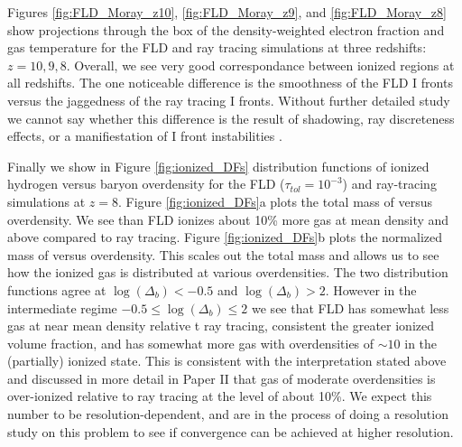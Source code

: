 {Figures \ref{fig:FLD_Moray_z10}, \ref{fig:FLD_Moray_z9}, and \ref{fig:FLD_Moray_z8} show projections through the box of the density-weighted electron fraction and gas temperature for the FLD and ray tracing simulations at three redshifts: $z=10, 9, 8$. Overall, we see very good correspondance between ionized regions at all redshifts. The one noticeable difference is the smoothness of the FLD I fronts versus the jaggedness of the ray tracing I fronts. Without further detailed study we cannot say whether this difference is the result of shadowing, ray discreteness effects, or a manifiestation of I front instabilities \citep{WhalenNorman2008a,WhalenNorman2008b,WhalenNorman2011}. 

Finally we show in Figure \ref{fig:ionized_DFs} distribution functions of ionized hydrogen versus baryon overdensity for the FLD ($\tau_{tol}=10^{-3}$) and ray-tracing simulations at $z=8$. Figure \ref{fig:ionized_DFs}a plots the total mass of \hii versus overdensity. We see than FLD ionizes about 10\% more gas at mean density and above compared to ray tracing.   Figure \ref{fig:ionized_DFs}b plots the normalized mass of \hii versus overdensity. This scales out the total mass and allows us to see how the ionized gas is distributed at various overdensities. The two distribution functions agree at $\log (\Delta_b) < -0.5$ and $\log (\Delta_b) > 2$. However in the intermediate regime $-0.5 \leq \log (\Delta_b) \leq 2$ we see that FLD has somewhat less gas at near mean density relative t ray tracing, consistent the greater ionized volume fraction, and has somewhat more gas with overdensities of $\sim 10$ in the (partially) ionized state.  This is consistent with the interpretation stated above and discussed in more detail in Paper II that gas of moderate overdensities is over-ionized relative to ray tracing at the level of about 10\%. We expect this number to be resolution-dependent, and are in the process of doing a resolution study on this problem to see if convergence can be achieved at higher resolution. }

